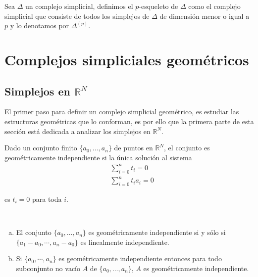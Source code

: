 \begin{Defi}
Sea $\Delta$ un complejo simplicial, definimos el $p$-esqueleto de $\Delta$ como el complejo simplicial que consiste de todos los simplejos de $\Delta$ de dimensión menor o igual a $p$ y lo denotamos por $\Delta^{(p)}$.
\end{Defi}

\section{Complejos simpliciales geométricos}
\subsection{Simplejos en $\mathbb{R}^N$}  
El primer paso para definir un complejo simplicial geométrico, es estudiar las estructuras geométricas que lo conforman, es por ello que la primera parte de esta sección está dedicada a analizar los simplejos en $\mathbb{R}^N$.           
\begin{Defi}
Dado un conjunto finito $\{a_0,\ldots,a_n\}$ de puntos en $\mathbb{R}^{N}$, el conjunto es geométricamente independiente si la única solución al sistema 
\begin{equation}\label{s1}
    \begin{split}
     &\sum_{i=0}^{n}t_{i} = 0 \\
     &\sum_{i=0}^{n}t_{i}a_{i} = 0   
    \end{split}
\end{equation}

es $t_i = 0$ para toda $i$.
\end{Defi}

\begin{Teo}
~\begin{enumerate}[(a)]
    \item El conjunto $\{a_0,\ldots,a_n\}$ es geométricamente independiente si y sólo si $\{a_1-a_0,\cdots,a_n-a_0\}$ es linealmente independiente.
    \item Si $\{a_0,\cdots,a_n\}$ es geométricamente independiente entonces para todo subconjunto no vacío $A$ de $\{a_0,\ldots,a_n\}$, $A$ es geométricamente independiente.
\end{enumerate}
\end{Teo}

